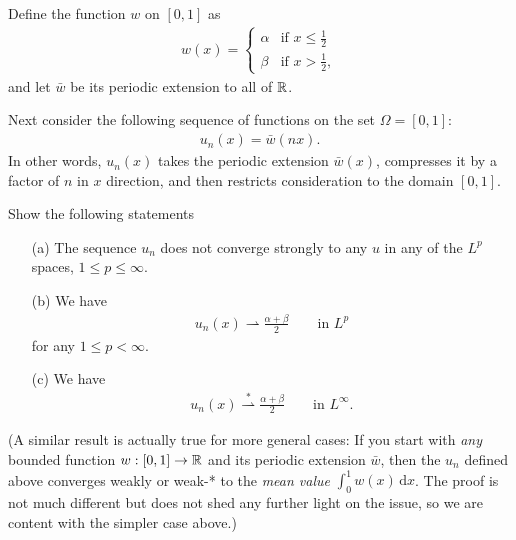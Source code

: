 \documentclass[12pt]{memoir}
\begin{document}
\begin{Ej}
    Define the function $w$ on $[0,1]$ as
\begin{align*}
  w(x) = \begin{cases}
    \alpha & \text{if $x\le\frac 12$} \\
    \beta & \text{if $x>\frac 12$},
  \end{cases}
\end{align*}
and let $\bar w$ be its periodic extension to all of $\mathbb{R}$.

Next consider the following sequence of functions on the set $\Omega=[0,1]$:
\begin{align*}
  u_n(x) = \bar w(nx).
\end{align*}
In other words, $u_n(x)$ takes the periodic extension $\bar w(x)$,
compresses it by a factor of $n$ in $x$ direction, and then restricts
consideration to the domain $[0,1]$.

Show the following statements
\begin{itemize}
\item[(a)] The sequence $u_n$ does not converge strongly to any $u$ in
  any of the $L^p$ spaces, $1\le p \le \infty$.

\item[(b)] We have
\begin{align*}
  u_n(x) \rightharpoonup \frac{\alpha+\beta}{2} \qquad \text{in $L^p$}
\end{align*}
for any $1\le p<\infty$.
  
\item[(c)] We have
\begin{align*}
  u_n(x) \overset{\ast}{\rightharpoonup} \frac{\alpha+\beta}{2}  \qquad \text{in $L^\infty$}.
\end{align*}
\end{itemize}

(A similar result is actually true for more general cases: If you
start with \textit{any} bounded function $w:[0,1]\rightarrow \mathbb{R}$ and its
periodic extension $\bar w$, then the $u_n$ defined above converges
weakly or weak-* to the \textit{mean value} $\int_0^1 w(x)\,
\text{d}x$. The proof is not much different but does not shed any
further light on the issue, so we are content with the simpler case above.)
\end{Ej}
\end{document}
